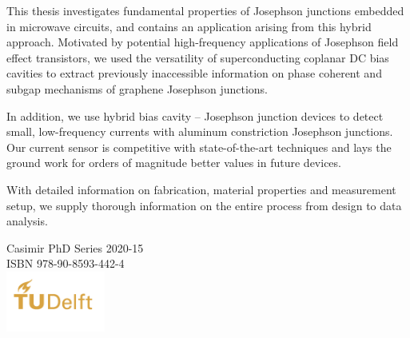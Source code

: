 \documentclass{dissertation-edit}
\begin{document}
\vspace*{1cm}

\Large

\noindent This thesis investigates fundamental properties of Josephson junctions embedded in microwave circuits, and contains an application arising from this hybrid approach.
%
Motivated by potential high-frequency applications of Josephson field effect transistors, we used the versatility of superconducting coplanar DC bias cavities to extract previously inaccessible information on phase coherent and subgap mechanisms of graphene Josephson junctions.

\noindent \newline
In addition, we use hybrid bias cavity -- Josephson junction devices to detect small, low-frequency currents with aluminum constriction Josephson junctions.
%
Our current sensor is competitive with state-of-the-art techniques and lays the ground work for orders of magnitude better values in future devices.

\noindent \newline
With detailed information on fabrication, material properties and measurement setup, we supply thorough information on the entire process from design to data analysis.

\vspace{2.5cm}\noindent\newline\centering
Casimir PhD Series 2020-15\\
ISBN 978-90-8593-442-4\\
\includegraphics[height=2cm]{TU_P5_color_full}
\end{document}
